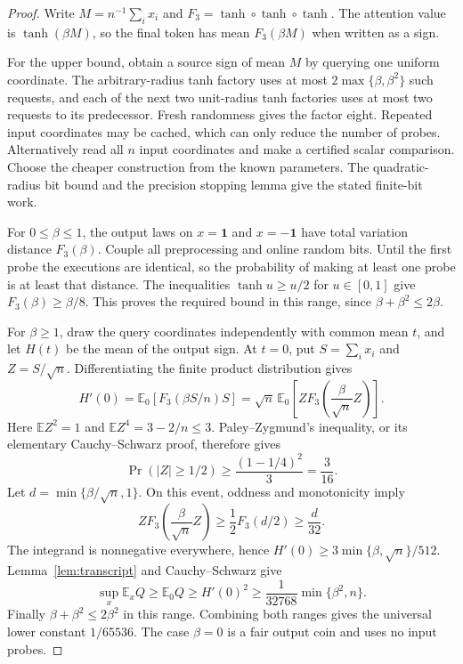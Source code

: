 \begin{proof}
Write $M=n^{-1}\sum_i x_i$ and $F_3=\tanh\circ\tanh\circ\tanh$.
The attention value is $\tanh(\beta M)$, so the final token has
mean $F_3(\beta M)$ when written as a sign.

For the upper bound, obtain a source sign of mean $M$ by querying
one uniform coordinate. The arbitrary-radius tanh factory uses at
most $2\max\{\beta,\beta^2\}$ such requests, and each of the next
two unit-radius tanh factories uses at most two requests to its
predecessor. Fresh randomness gives the factor eight. Repeated
input coordinates may be cached, which can only reduce the number
of probes. Alternatively read all $n$ input coordinates and make a
certified scalar comparison. Choose the cheaper construction from
the known parameters. The quadratic-radius bit bound and the
precision stopping lemma give the stated finite-bit work.

For $0\le\beta\le1$, the output laws on $x=\mathbf1$ and
$x=-\mathbf1$ have total variation distance $F_3(\beta)$.
Couple all preprocessing and online random bits. Until the first
probe the executions are identical, so the probability of making
at least one probe is at least that distance. The inequalities
$\tanh u\ge u/2$ for $u\in[0,1]$ give
$F_3(\beta)\ge\beta/8$. This proves the required bound in this range,
since $\beta+\beta^2\le2\beta$.

For $\beta\ge1$, draw the query coordinates independently with
common mean $t$, and let $H(t)$ be the mean of the output sign.
At $t=0$, put $S=\sum_i x_i$ and $Z=S/\sqrt n$. Differentiating
the finite product distribution gives
\[
 H'(0)=\mathbb E_0[F_3(\beta S/n)S]
 =\sqrt n\,\mathbb E_0\left[Z F_3\left(\frac\beta{\sqrt n}Z\right)\right].
\]
Here $\mathbb E Z^2=1$ and $\mathbb E Z^4=3-2/n\le3$.
Paley--Zygmund's inequality, or its elementary Cauchy--Schwarz proof,
therefore gives
\[
 \Pr(|Z|\ge1/2)\ge\frac{(1-1/4)^2}{3}=\frac3{16}.
\]
Let $d=\min\{\beta/\sqrt n,1\}$. On this event, oddness and
monotonicity imply
\[
 ZF_3\left(\frac\beta{\sqrt n}Z\right)
 \ge\frac12 F_3(d/2)\ge\frac d{32}.
\]
The integrand is nonnegative everywhere, hence
$H'(0)\ge3\min\{\beta,\sqrt n\}/512$.
Lemma~\ref{lem:transcript} and Cauchy--Schwarz give
\[
 \sup_x\mathbb E_xQ\ge\mathbb E_0Q
 \ge H'(0)^2
 \ge\frac1{32768}\min\{\beta^2,n\}.
\]
Finally $\beta+\beta^2\le2\beta^2$ in this range. Combining both
ranges gives the universal lower constant $1/65536$.
The case $\beta=0$
is a fair output coin and uses no input probes.
\end{proof}

